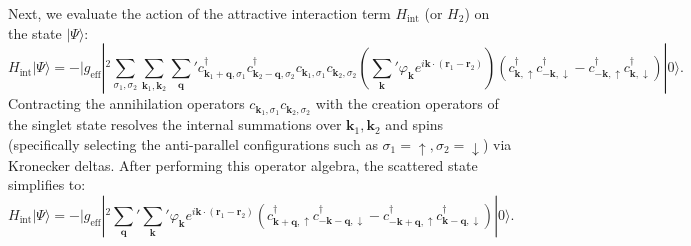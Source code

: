 Next, we evaluate the action of the attractive interaction term \( H_{\text{int}} \) (or \( H_2 \)) on the state \( |\Psi\rangle \):
\[
    H_{\text{int}} |\Psi\rangle = -|g_{\text{eff}}|^2 \sum_{\sigma_1, \sigma_2} \sum_{\mathbf{k}_1, \mathbf{k}_2} \sum_{\mathbf{q}}' c_{\mathbf{k}_1 + \mathbf{q}, \sigma_1}^\dagger c_{\mathbf{k}_2 - \mathbf{q}, \sigma_2}^\dagger c_{\mathbf{k}_1, \sigma_1} c_{\mathbf{k}_2, \sigma_2} \left( \sum_{\mathbf{k}}' \varphi_{\mathbf{k}} e^{i\mathbf{k} \cdot (\mathbf{r}_1 - \mathbf{r}_2)} \right) \left( c_{\mathbf{k}, \uparrow}^\dagger c_{-\mathbf{k}, \downarrow}^\dagger - c_{-\mathbf{k}, \uparrow}^\dagger c_{\mathbf{k}, \downarrow}^\dagger \right) |0\rangle.
\]
Contracting the annihilation operators \( c_{\mathbf{k}_1, \sigma_1} c_{\mathbf{k}_2, \sigma_2} \) with the creation operators of the singlet state resolves the internal summations over \( \mathbf{k}_1, \mathbf{k}_2 \) and spins (specifically selecting the anti-parallel configurations such as \( \sigma_1 = \uparrow, \sigma_2 = \downarrow \)) via Kronecker deltas. After performing this operator algebra, the scattered state simplifies to:
\[
    H_{\text{int}} |\Psi\rangle = -|g_{\text{eff}}|^2 \sum_{\mathbf{q}}' \sum_{\mathbf{k}}' \varphi_{\mathbf{k}} e^{i\mathbf{k} \cdot (\mathbf{r}_1 - \mathbf{r}_2)} \left( c_{\mathbf{k} + \mathbf{q}, \uparrow}^\dagger c_{-\mathbf{k} - \mathbf{q}, \downarrow}^\dagger - c_{-\mathbf{k} + \mathbf{q}, \uparrow}^\dagger c_{\mathbf{k} - \mathbf{q}, \downarrow}^\dagger \right) |0\rangle.
\]

